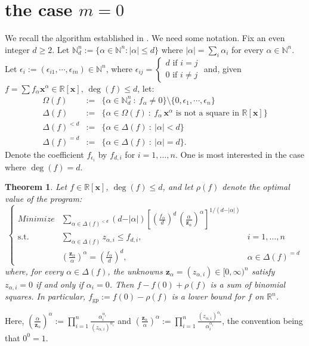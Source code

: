 \documentclass{amsart}
\newtheorem{thm}{Theorem}[section]
\theoremstyle{definition}
\begin{document}
\section{the case $m=0$}
%
We recall the algorithm established in \cite{gha-mar2}. We need some notation. Fix an even integer $d\ge 2$. Let
$\mathbb{N}^n_d:=\{\alpha\in\mathbb{N}^n:\vert\alpha\vert\leq d\}$ where $\vert\alpha\vert=\sum_i\alpha_i$ for every
$\alpha\in\mathbb{N}^n$. Let $\epsilon_i:=(\epsilon_{i1},\cdots,\epsilon_{in})\in\mathbb{N}^n$, where $\epsilon_{ij}= \begin{cases} d \text{ if } i=j \\ 0 \text{ if } i \ne j \end{cases}$ and, given $f= \sum f_{\alpha} \mathbf{x}^{\alpha}\in\mathbb{R}[\mathbf{x}]$, $\deg(f)\le d$, let:
\[
\begin{array}{lcl}
\Omega(f)&:=&\{\alpha\in\mathbb{N}^n_{d}\::\:f_\alpha\neq0\}\setminus\{0,\epsilon_1,\cdots,\epsilon_n\}\\
\Delta(f)&:=&\{\alpha\in\Omega(f)\::\:f_\alpha\,\mathbf{x}^\alpha\mbox{ is not a square in }\mathbb{R}[\mathbf{x}]\}\\
\Delta(f)^{< d}&:=&\{\alpha\in\Delta(f)\::\:\vert\alpha\vert <d\}\\
\Delta(f)^{= d}&:=&\{\alpha\in\Delta(f)\::\:\vert\alpha\vert =d\}.
\end{array}
\]
Denote the coefficient $f_{\epsilon_i}$ by $f_{d,i}$ for $i=1,\dots,n$. One is most interested in the case where $\deg(f)=d$.
%
\begin{thm} \cite[Theorem 3.1]{gha-mar2}
\label{thm1}
Let $f\in\mathbb{R}[\mathbf{x}]$, $\deg(f)\le d$, and let $\rho(f)$ denote the optimal value of the program:
%
\begin{equation}
\label{lw}
\left\{
\begin{array}{lll}
Minimize & \sum\limits_{\alpha\in\Delta(f)^{<d}}(d-\vert\alpha\vert)
\left[\left(\frac{f_\alpha}{d}\right)^{d}\,\left(\frac{\alpha}{\mathbf{z}_\alpha}\right)^\alpha\right]^{1/(d-\vert\alpha\vert)} & \\
\mbox{s.t.} & \sum\limits_{\alpha\in\Delta(f)}z_{\alpha,i}\le f_{d,i}, & i=1,\ldots,n\\
& \left(\frac{\mathbf{z}_\alpha}{\alpha}\right)^\alpha =\left(\frac{f_\alpha}{d}\right)^{d}, & \alpha\in\Delta(f)^{=d}
\end{array}\right.
\end{equation}
%
where, for every $\alpha\in\Delta(f)$, the unknowns $\mathbf{z}_\alpha = (z_{\alpha,i})\in[0,\infty)^n$ satisfy $z_{\alpha,i}= 0$
if and only if $\alpha_i=0$. Then $f-f(0)+\rho(f)$ is a sum of binomial squares. In particular,
$f_{\operatorname{gp}} := f(0)-\rho(f)$ is a lower bound for $f$ on $\mathbb{R}^n$.
\end{thm}
%
Here, $\left(\frac{\alpha}{\mathbf{z}_\alpha}\right)^\alpha := \prod_{i=1}^n \frac{\alpha_i^{\alpha_i}}{(z_{\alpha,i})^{\alpha_i}}$
and $\left(\frac{\mathbf{z}_\alpha}{\alpha}\right)^\alpha := \prod_{i=1}^n \frac{(z_{\alpha,i})^{\alpha_i}}{\alpha_i^{\alpha_i}}$,
the convention being that $0^0 = 1$.
\end{document}
